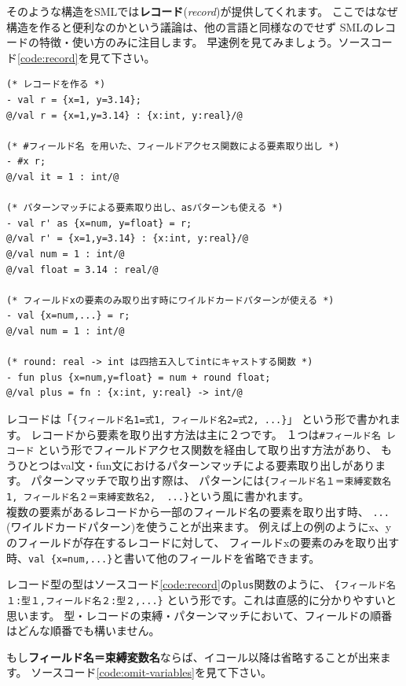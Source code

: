 \documentclass[11pt,a4paper]{article}
\begin{document}
そのような構造をSMLでは\textbf{レコード}(\textit{record})が提供してくれます。
ここではなぜ構造を作ると便利なのかという議論は、他の言語と同様なのでせず
SMLのレコードの特徴・使い方のみに注目します。
早速例を見てみましょう。ソースコード\ref{code:record}を見て下さい。

\begin{lstlisting}[caption=レコードの例,label=code:record]
(* レコードを作る *)
- val r = {x=1, y=3.14};
@/val r = {x=1,y=3.14} : {x:int, y:real}/@

(* #フィールド名 を用いた、フィールドアクセス関数による要素取り出し *)
- #x r;
@/val it = 1 : int/@

(* パターンマッチによる要素取り出し、asパターンも使える *)
- val r' as {x=num, y=float} = r;
@/val r' = {x=1,y=3.14} : {x:int, y:real}/@
@/val num = 1 : int/@
@/val float = 3.14 : real/@

(* フィールドxの要素のみ取り出す時にワイルドカードパターンが使える *)
- val {x=num,...} = r;
@/val num = 1 : int/@

(* round: real -> int は四捨五入してintにキャストする関数 *)
- fun plus {x=num,y=float} = num + round float;
@/val plus = fn : {x:int, y:real} -> int/@
\end{lstlisting}

レコードは「\lstinline|{フィールド名1=式1, フィールド名2=式2, ...}|」
という形で書かれます。
レコードから要素を取り出す方法は主に２つです。
１つは\lstinline{#フィールド名 レコード}
という形でフィールドアクセス関数を経由して取り出す方法があり、
もうひとつはval文・fun文におけるパターンマッチによる要素取り出しがあります。
パターンマッチで取り出す際は、
パターンには\lstinline|{フィールド名１＝束縛変数名1, フィールド名２＝束縛変数名2,  ...}|という風に書かれます。\\
複数の要素があるレコードから一部のフィールド名の要素を取り出す時、
\lstinline{...}(ワイルドカードパターン)を使うことが出来ます。
例えば上の例のようにx、yのフィールドが存在するレコードに対して、
フィールドxの要素のみを取り出す時、\lstinline|val {x=num,...}|と書いて他のフィールドを省略できます。

レコード型の型はソースコード\ref{code:record}の\lstinline{plus}関数のように、
\lstinline|{フィールド名１:型１,フィールド名２:型２,...}|
という形です。これは直感的に分かりやすいと思います。
型・レコードの束縛・パターンマッチにおいて、フィールドの順番はどんな順番でも構いません。

もし\textbf{フィールド名＝束縛変数名}ならば、イコール以降は省略することが出来ます。
ソースコード\ref{code:omit-variables}を見て下さい。
\end{document}
